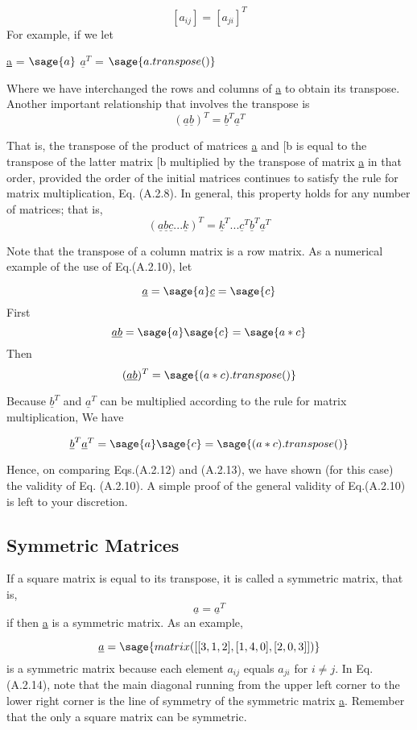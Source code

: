 \documentclass[12pt]{report}
\newcommand{\gen}[1]{
[#1_{{ij}}]
}
\begin{document}
\[\gen{a} =[a_{{ji}}]^T\]
For example, if we let
\begin{center}
\underline{a} = $\sage{a}$
$\underline{a}^T$ = $\sage{a.transpose()}$
\end{center}

Where we have interchanged the rows and columns of \underline{a} to
obtain its transpose.
Another important relationship that involves the
transpose is
$$ (\underline{a}\underline{b})^T = \underline{b}^T \underline{a}^T $$

That is, the transpose of the product of matrices \underline{a} and
[b is equal to the transpose of the latter matrix
[b multiplied by the transpose of matrix \underline{a} in
that order, provided the order of the initial matrices continues to
satisfy the rule for matrix multiplication, Eq. (A.2.8). In general,
this property holds for any number of matrices; that is,
$$(\underline{a}\underline{b}\underline{c}...\underline{k})^T = \underline{k}^T... \underline{c}^T\underline{b}^T\underline{a}^T $$ 

Note that the transpose of a column matrix is a row matrix. As a
numerical example of the use of Eq.(A.2.10), let

$$\underline{a} = \sage{a}  \underline{c} = \sage{c}$$
First$$\underline{a}\underline{b} = \sage{a}\sage{c}=\sage{a*c}$$
Then $$(\underline{a}\underline{b})^T= \sage{(a*c).transpose()}$$

Because $\underline{b}^T$ and $\underline{a}^T$ can be multiplied
according to the rule for matrix multiplication, We have

$$ \underline{b}^T\underline{a}^T = \sage{a} \sage{c} = \sage{(a*c).transpose()}$$

Hence, on comparing Eqs.(A.2.12) and (A.2.13), we have shown (for this
case) the validity of Eq. (A.2.10). A simple proof of the general
validity of Eq.(A.2.10) is left to your discretion.
\subsection{Symmetric Matrices}
If a square matrix is equal to its transpose, it is called a symmetric
matrix, that is,
$$ \underline{a} = \underline{a}^T $$
 if then \underline{a} is a symmetric matrix. As an
example,

$$\underline{a}=\sage{matrix([[3,1,2],[1,4,0],[2,0,3]])}$$
is a symmetric matrix because each element $a_{{ij}}$ equals $a_{{ji}}$ for $i
\neq j$. In Eq. (A.2.14), note that the main diagonal running from the
upper left corner to the lower right corner is the line of symmetry of
the symmetric matrix \underline{a}. Remember that the only a square
matrix can be symmetric.
\end{document}
